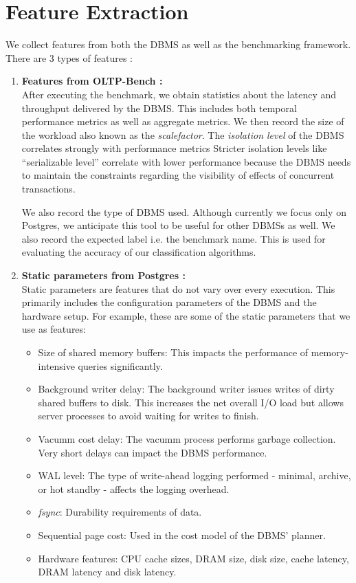 \section{Feature Extraction} \label{sec:features}

We collect features from both the DBMS as well as the benchmarking framework. 
There are 3 types of features :\\

\begin{enumerate}
  \item{\textbf{Features from OLTP-Bench :}\\
  After executing the benchmark, we obtain statistics about the latency and
  throughput delivered by the DBMS.
  This includes both temporal performance metrics as well as aggregate metrics. 
  We then record the size of the workload also known as the
  \textit{scalefactor}.
  The \textit{isolation level} of the DBMS correlates strongly with performance
  metrics Stricter isolation levels like ``serializable level'' correlate with lower
  performance because the DBMS needs to maintain the constraints regarding
  the visibility of effects of concurrent transactions. 
  
  We also record the type
  of DBMS used. Although currently we focus only on Postgres, 
  we anticipate this tool to be useful for other DBMSs as well.   
  We also record the expected label i.e. the benchmark name. This is used for
  evaluating the accuracy of our classification algorithms.  
  }
  
  \item {\textbf{Static parameters from Postgres :}\\
  Static parameters are features that do not vary over every execution. This
  primarily includes the configuration parameters of the DBMS and the hardware
  setup.
  For example, these are some of the static parameters that we use as features:\\
   
  \begin{itemize}
    \item {Size of shared memory buffers: This impacts the performance of
    memory-intensive queries significantly.}
    \item {Background writer delay: The background writer issues writes of
    dirty shared buffers to disk. This increases the net overall I/O load but
    allows server processes to avoid waiting for writes to finish.}
    \item {Vacumm cost delay: The vacumm process performs garbage 
    collection. Very short delays can impact the DBMS performance.}
    \item {WAL level: The type of write-ahead logging performed - minimal,
    archive, or hot standby - affects the logging overhead.}
    \item {\textit{fsync}: Durability requirements of data.}
    \item {Sequential page cost: Used in the cost model of the DBMS' planner.}
	\item {Hardware features: CPU cache sizes, DRAM size, disk size, cache latency,
	DRAM latency and disk latency.}
  \end{itemize}
  
}
\end{enumerate}

